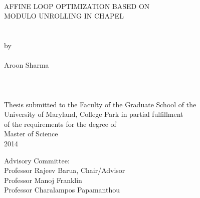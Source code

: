 
\thispagestyle{empty}
\hbox{\ }
\vspace{1in}
\renewcommand{\baselinestretch}{1}
\small\normalsize
\begin{center}

\large{{AFFINE LOOP OPTIMIZATION BASED ON \\
MODULO UNROLLING IN CHAPEL}}\\
\ \\
\ \\
\large{by} \\
\ \\
\large{Aroon Sharma}%
\ \\
\ \\
\ \\
\ \\
\normalsize
Thesis submitted to the Faculty of the Graduate School of the \\
University of Maryland, College Park in partial fulfillment \\
of the requirements for the degree of \\
Master of Science \\
2014
\end{center}

\vspace{7.5em}

\noindent Advisory Committee: \\
Professor Rajeev Barua, Chair/Advisor \\
Professor Manoj Franklin \\
Professor Charalampos Papamanthou
